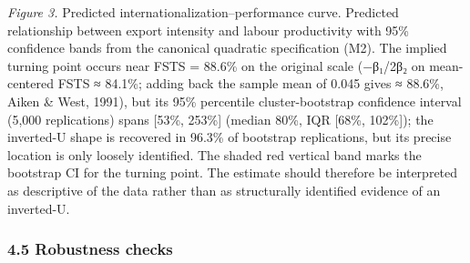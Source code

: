 \documentclass[
  12pt,a4paper]{article}
\begin{document}
\emph{Figure 3.} Predicted internationalization--performance curve.
Predicted relationship between export intensity and labour productivity
with 95\% confidence bands from the canonical quadratic specification
(M2). The implied turning point occurs near FSTS = 88.6\% on the
original scale (−β₁/2β₂ on mean-centered FSTS ≈ 84.1\%; adding back the
sample mean of 0.045 gives ≈ 88.6\%, Aiken \& West, 1991), but its 95\%
percentile cluster-bootstrap confidence interval (5,000 replications)
spans {[}53\%, 253\%{]} (median 80\%, IQR {[}68\%, 102\%{]}); the
inverted-U shape is recovered in 96.3\% of bootstrap replications, but
its precise location is only loosely identified. The shaded red vertical
band marks the bootstrap CI for the turning point. The estimate should
therefore be interpreted as descriptive of the data rather than as
structurally identified evidence of an inverted-U.

\hypertarget{robustness-checks}{%
\subsubsection{4.5 Robustness checks}\label{robustness-checks}}
\end{document}

